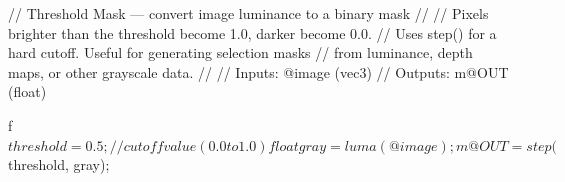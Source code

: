 // Threshold Mask — convert image luminance to a binary mask
//
// Pixels brighter than the threshold become 1.0, darker become 0.0.
// Uses step() for a hard cutoff. Useful for generating selection masks
// from luminance, depth maps, or other grayscale data.
//
// Inputs:  @image (vec3)
// Outputs: m@OUT  (float)

f$threshold = 0.5;   // cutoff value (0.0 to 1.0)

float gray = luma(@image);
m@OUT = step($threshold, gray);
